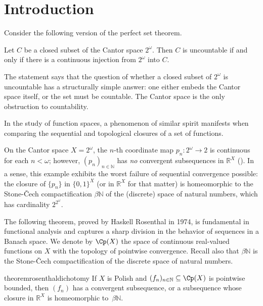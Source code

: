 
\chapter{Introduction}\label{ch:introduction}

Consider the following version of the perfect set theorem.
\begin{theorem}[Cantor]\label{thm:cantor-perfect}
    Let $C$ be a closed subset of the Cantor space $2^\omega$.
    Then $C$ is uncountable if and only if there is a continuous injection from $2^\omega$ into $C$.
\end{theorem}
The statement says that the question of whether a closed subset of $2^\omega$ is uncountable has a structurally simple answer: one either embeds the Cantor space itself, or the set must be countable.
The Cantor space is the only obstruction to countability.

In the study of function spaces, a phenomenon of similar spirit manifests when comparing the sequential and topological closures of a set of functions.

On the Cantor space $X = 2^\omega$, the $n$-th coordinate map $p_n\colon 2^\omega\to2$ is continuous for each $n<\omega$; however, $(p_n)_{n\in\mathbb{N}}$ has \emph{no} convergent subsequences in $\mathbb{R}^X$ (\cite[Chapter~1.1]{Todorcevic_1997_TopicsTop}).
In a sense, this example exhibits the worst failure of sequential convergence possible: the closure of $\{p_n\}$ in $\{0, 1\}^X$ (or in $\mathbb{R}^X$ for that matter) is homeomorphic to the Stone-Čech compactification $\beta\mathbb{N}$ of the (discrete) space of natural numbers, which has cardinality $2^{2^{\omega}}$.

The following theorem, proved by Haskell Rosenthal in 1974, is fundamental in functional analysis and captures a sharp division in the behavior of sequences in a Banach space.
We denote by $\Cp(X)$ the space of continuous real-valued functions on $X$ with the topology of pointwise convergence.
Recall also that $\beta\mathbb{N}$ is the Stone-\v{C}ech compactification of the discrete space of natural numbers.

\begin{restatable}{theorem}{rosenthaldichotomy}\label{thm:Rosenthal}
    If $X$ is Polish and $(f_n)_{n\in\mathbb{N}}\subseteq \Cp(X)$ is pointwise bounded, then $(f_n)$ has a convergent subsequence, or a subsequence whose closure in $\mathbb{R}^X$ is homeomorphic to~$\beta\mathbb{N}$.
\end{restatable}

